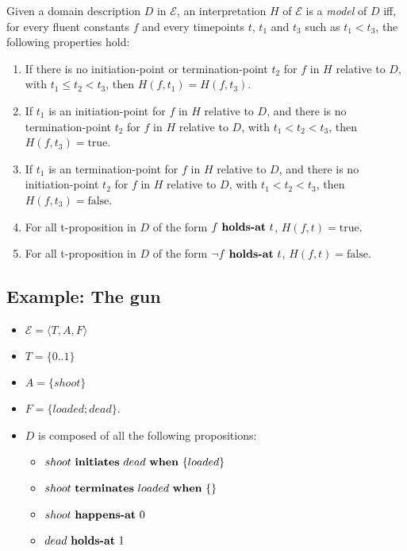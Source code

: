 \begin{definition}[model]
  Given a domain description $D$ in $\mathcal{E}$, an interpretation $H$ of $\mathcal{E}$ is a \emph{model} of $D$ iff, for every fluent constants $f$ and every timepoints $t$, $t_1$ and $t_3$ such as $t_1 < t_3$, the following properties hold:
  \begin{enumerate}
    \item If there is no initiation-point or termination-point $t_2$ for $f$ in $H$ relative to $D$, with $t_1 \leq t_2 < t_3$, then $H(f,t_1)=H(f,t_3)$.
    \item If $t_1$ is an initiation-point for $f$ in $H$ relative to $D$, and there is no termination-point $t_2$ for $f$ in $H$ relative to $D$, with $t_1 < t_2 < t_3$, then $H(f,t_3)=\text{true}$.
    \item If $t_1$ is an termination-point for $f$ in $H$ relative to $D$, and there is no initiation-point $t_2$ for $f$ in $H$ relative to $D$, with $t_1 < t_2 < t_3$, then $H(f,t_3)=\text{false}$.
    \item For all t-proposition in $D$ of the form $f \text{  \textbf{holds-at} } t$, $H(f,t)=\text{true}$.
    \item For all t-proposition in $D$ of the form $\neg f \text{  \textbf{holds-at} } t$, $H(f,t)=\text{false}$.
  \end{enumerate}
\end{definition}

\subsection{Example: The gun}

\begin{itemize}
  \item $\mathcal{E}=\langle T,A,F\rangle$
  \item $T=\{0..1\}$
  \item $A=\{shoot\}$
  \item $F=\{loaded;dead\}$.
  \item $D$ is composed of all the following propositions:
  \begin{itemize}
    \item $shoot \text{ \textbf{initiates} } dead \text{  \textbf{when} } \{loaded\}$
    \item $shoot \text{ \textbf{terminates} } loaded \text{  \textbf{when} } \{\}$
    \item $shoot \text{  \textbf{happens-at} } 0$
    \item $dead \text{  \textbf{holds-at} } 1$
  \end{itemize}
\end{itemize}

